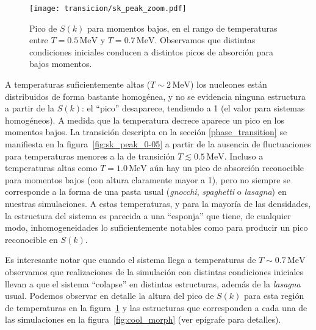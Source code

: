 \begin{figure}
  \centering
  \texttt{[image: transicion/sk\_peak\_zoom.pdf]}
  \caption{Pico de $S(k)$ para momentos bajos, en el rango de temperaturas entre $T=0.5\,\text{MeV}$ y $T=0.7\,\text{MeV}$.
    Observamos que distintas condiciones iniciales conducen a distintos picos de absorción para bajos momentos.}
  \label{fig:sk_peak_zoom}
\end{figure}

A temperaturas suficientemente altas ($T\sim 2\,\text{MeV}$) los nucleones están distribuidos de forma bastante homogénea, y no se evidencia ninguna estructura a partir de la $S(k)$: el ``pico'' desaparece, tendiendo a 1 (el valor para sistemas homogéneos).
A medida que la temperatura decrece aparece un pico en los momentos bajos.
La transición descripta en la sección \ref{phase_transition} se manifiesta en la figura~\ref{fig:sk_peak_0-05} a partir de la ausencia de fluctuaciones para temperaturas menores a la de transición $T \lesssim 0.5\,\text{MeV}$.
Incluso a temperaturas altas como
$T=1.0\,\text{MeV}$ aún hay un pico de absorción reconocible para momentos bajos (con altura claramente mayor a 1), pero no siempre se corresponde a la forma de una pasta usual (\emph{gnocchi}, \emph{spaghetti} o
\emph{lasagna}) en nuestras simulaciones.
A estas temperaturas, y para la mayoría de las densidades, la estructura del sistema es parecida a una ``esponja'' que tiene, de cualquier modo, inhomogeneidades lo suficientemente notables como para producir un pico reconocible en $S(k)$.

Es interesante notar que cuando el sistema llega a temperaturas de $T\sim 0.7\,\text{MeV}$ observamos que realizaciones de la simulación con distintas condiciones iniciales llevan a que el sistema ``colapse'' en distintas estructuras, además de la \emph{lasagna} usual.
Podemos observar en detalle la altura del pico de  $S(k)$ para esta región de temperaturas en la figura~\ref{fig:sk_peak_zoom} y las estructuras que corresponden a cada una de las simulaciones en la figura~\ref{fig:cool_morph} (ver epígrafe para detalles).

